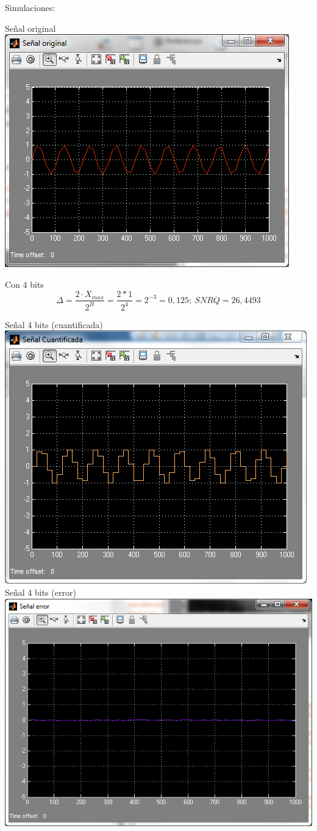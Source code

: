 \documentclass[a4paper,12pt]{article}
\begin{document}
\begin{enumerate}
\begin{center}
\end{center}
Simulaciones:\\
\begin{center}
Señal original\\
\includegraphics[width=.65 \textwidth]{signal-original.png}
\end{center}
Con 4 bits\\
$$\Delta = \frac{2 \cdot X_{max}}{2^B} = \frac{2 * 1}{2^4} = 2^{-3} = 0,125;\ SNRQ = 26,4493 $$
\begin{center}
Señal 4 bits (cuantificada)\\
\includegraphics[width=.65 \textwidth]{signal-cuantificada-4-bits.png}\\
Señal 4 bits (error)\\
\includegraphics[width=.65 \textwidth]{signal-error-4-bits.png}

\end{center}
\end{enumerate}
\end{document}
